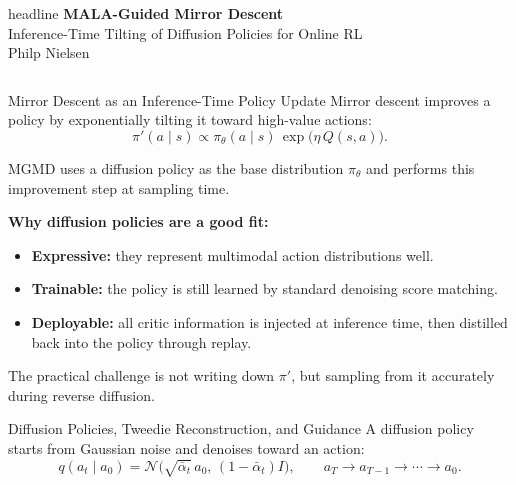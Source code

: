\documentclass[final,hyperref={pdfpagelabels=false}]{beamer}
\newlength{\colwidth}
\begin{document}
\begin{frame}[t]

\begin{beamercolorbox}[wd=\paperwidth,ht=10cm]{headline}
\vspace{1cm}
\centering
{\fontsize{72}{80}\selectfont\bfseries MALA-Guided Mirror Descent}\\[0.8cm]
{\fontsize{42}{50}\selectfont Inference-Time Tilting of Diffusion Policies for Online RL}\\[1cm]
{\fontsize{36}{44}\selectfont Philp Nielsen}\\[0.5cm]
\end{beamercolorbox}

\vspace{1cm}

\begin{columns}[t]

\begin{column}{\colwidth}

\begin{block}{\Large Mirror Descent as an Inference-Time Policy Update}
\small
Mirror descent improves a policy by exponentially tilting it toward high-value actions:
\[
\pi'(a\mid s) \propto \pi_\theta(a\mid s)\,\exp\!\bigl(\eta\,Q(s,a)\bigr).
\]

\vspace{0.3em}
MGMD uses a diffusion policy as the base distribution $\pi_\theta$ and performs this improvement step at sampling time.

\vspace{0.3em}
\textbf{Why diffusion policies are a good fit:}
\begin{itemize}
    \item \textbf{Expressive:} they represent multimodal action distributions well.
    \item \textbf{Trainable:} the policy is still learned by standard denoising score matching.
    \item \textbf{Deployable:} all critic information is injected at inference time, then distilled back into the policy through replay.
\end{itemize}

\vspace{0.3em}
The practical challenge is not writing down $\pi'$, but sampling from it accurately during reverse diffusion.
\end{block}

\vspace{0.8cm}

\begin{block}{\Large Diffusion Policies, Tweedie Reconstruction, and Guidance}
\small
A diffusion policy starts from Gaussian noise and denoises toward an action:
\[
q(a_t\mid a_0)=\mathcal{N}\!\bigl(\sqrt{\bar\alpha_t}\,a_0,\,(1-\bar\alpha_t)I\bigr),
\qquad
a_T \to a_{T-1} \to \cdots \to a_0.
\]


\end{block}
\end{column}
\end{columns}
\end{frame}
\end{document}
